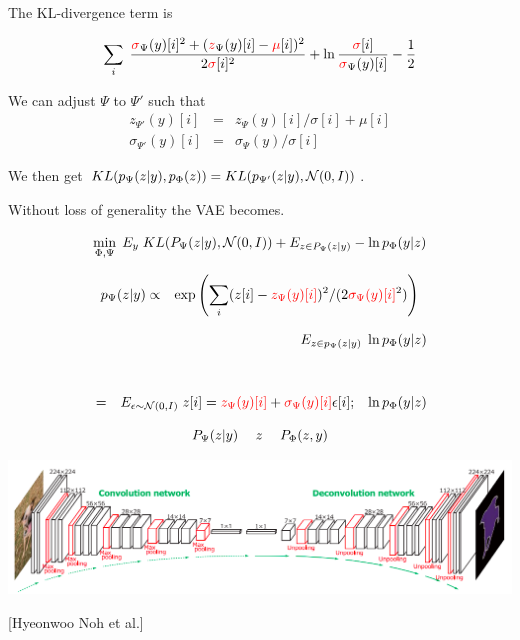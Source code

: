 {

The KL-divergence term is
    
$$\sum_i \;\frac{{\color{red} \sigma}_\Psi(y)[i]^2 +({\color{red} z}_\Psi(y)[i] - {\color{red} \mu}[i])^2}{2 {\color{red} \sigma}[i]^2} + \ln\frac{{\color{red} \sigma}[i]}{{\color{red} \sigma}_\Psi(y)[i]} - \frac{1}{2}$$

\vfill
We can adjust $\Psi$ to $\Psi'$ such that
\begin{eqnarray*}
z_{\Psi'}(y)[i] & = & z_\Psi(y)[i]/\sigma[i] + \mu[i] \\
\sigma_{\Psi'}(y)[i] & = & \sigma_\Psi(y)/\sigma[i]
\end{eqnarray*}

\vfill
We then get {\color{red} $KL(p_{\Psi}(z|y),p_\Phi(z)) = KL(p_{\Psi'}(z|y),{\cal N}(0,I))$}.


\vfill
Without loss of generality the VAE becomes.

{\color{red} $$\min_{\Phi,\Psi}\; E_y\;KL(P_\Psi(z|y),{\cal N}(0,I)) + E_{z \in P_\Psi(z|y)} - \ln p_\Phi(y|z) $$}

\begin{eqnarray*}
p_\Psi(z|y) & \propto & \exp\left(\sum_i (z[i] - {\color{red}
z_\Psi(y)[i]})^2/(2{\color{red} \sigma_\Psi(y)[i]}^2)\right)
\end{eqnarray*}

\vfill
\begin{eqnarray*}
& & E_{z \in p_\Psi(z|y)} \;\ln p_\Phi(y|z)\\
\\
\\
& = & E_{\epsilon \sim {\cal N}(0,I)} \;z[i] = {\color{red}
z_\Psi(y)[i]} + {\color{red} \sigma_\Psi(y)[i]}\epsilon[i];\;\; \;\ln
p_\Phi(y|z)
\end{eqnarray*}


$$P_\Psi(z|y) \hspace{3ex} z \hspace{3ex} P_\Phi(z,y)$$

\centerline{\includegraphics[width=6in]{../images/Deconv}}
\centerline{\large [Hyeonwoo Noh et al.]}

}
